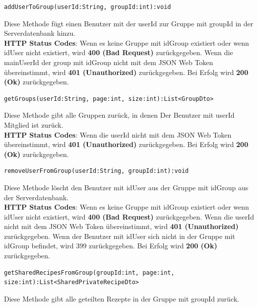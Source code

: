 \vspace{1cm}
 \begin{lstlisting}
addUserToGroup(userId:String, groupId:int):void
\end{lstlisting}
Diese Methode fügt einen Benutzer mit der userId  zur Gruppe mit groupId in der Serverdatenbank hinzu.\\
\textbf{HTTP Status Codes}:
Wenn es keine Gruppe mit idGroup existiert oder wenn idUser nicht existiert, wird \textbf{400 (Bad Request)} zurückgegeben. Wenn die mainUserId der group mit idGroup  nicht mit dem JSON Web Token übereinstimmt, wird \textbf{401 (Unauthorized)} zurückgegeben. Bei Erfolg wird \textbf{200 (Ok)} zurückgegeben.
\vspace{1cm}
 \begin{lstlisting}
getGroups(userId:String, page:int, size:int):List<GroupDto>
\end{lstlisting}
Diese Methode gibt alle Gruppen zurück, in denen Der Benutzer mit userId Mitglied ist zurück.\\
\textbf{HTTP Status Codes}:
Wenn die userId nicht mit dem JSON Web Token übereinstimmt, wird \textbf{401 (Unauthorized)} zurückgegeben. Bei Erfolg wird \textbf{200 (Ok)} zurückgegeben.
\vspace{1cm}
 \begin{lstlisting}
removeUserFromGroup(userId:String, groupId:int):void
\end{lstlisting}
Diese Methode löscht den Benutzer mit idUser aus der Gruppe mit idGroup aus der Serverdatenbank.\\
\textbf{HTTP Status Codes}:
Wenn es keine Gruppe mit idGroup existiert oder wenn idUser nicht existiert, wird \textbf{400 (Bad Request)} zurückgegeben. Wenn die userId nicht mit dem JSON Web Token übereinstimmt, wird \textbf{401 (Unauthorized)} zurückgegeben. Wenn der Benutzer mit idUser sich nicht in der Gruppe mit idGroup befindet, wird 399 zurückgegeben. Bei Erfolg wird \textbf{200 (Ok)} zurückgegeben.
\vspace{1cm}  
 \begin{lstlisting} 
getSharedRecipesFromGroup(groupId:int, page:int, size:int):List<SharedPrivateRecipeDto>
\end{lstlisting}
Diese Methode gibt alle geteilten Rezepte in der Gruppe mit groupId zurück.\\
